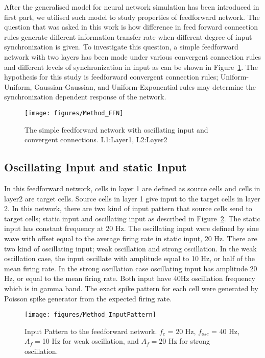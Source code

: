 After the generalised model for neural network simulation has been introduced in first part, we utilised such model to study properties of feedforward network. The question that was asked in this work is how difference in feed forward connection rules generate different information transfer rate when different degree of input synchronization is given. To investigate this question, a simple feedforward network with two layers has been made under various convergent connection rules and different levels of synchronization in input as can be shown in Figure~\ref{fig:FFmodel}. The hypothesis for this study is feedforward convergent connection rules; Uniform-Uniform, Gaussian-Gaussian, and Uniform-Exponential rules may determine the synchronization dependent response of the network.
\begin{figure}[!h]
	\centering
	\texttt{[image: figures/Method\_FFN]}
	\caption{The simple feedforward network with oscillating input and convergent connections. L1:Layer1, L2:Layer2}
	\label{fig:FFmodel}
\end{figure} 

\subsection{Oscillating Input and static Input}
 In this feedforward network, cells in layer 1 are defined as source cells and cells in layer2 are target cells. Source cells in layer 1 give input to the target cells in layer 2. In this network, there are two kind of input pattern that source cells send to target cells; static input and oscillating input as described in Figure~\ref{fig:InputFFN}.  The static input has constant frequency at 20 Hz. The oscillating input were defined by sine wave with offset equal to the average firing rate in static input, 20 Hz. There are two kind of oscillating input; weak oscillation and strong oscillation. In the weak oscillation case, the input oscillate with amplitude equal to 10 Hz, or half of the mean firing rate. In the strong oscillation case oscillating input has amplitude 20 Hz, or equal to the mean firing rate. Both input have 40Hz oscillation frequency which is in gamma band.  The exact spike pattern for each cell were generated by Poisson spike generator from the expected firing rate.

\begin{figure}[!h]
	\centering
	\texttt{[image: figures/Method\_InputPattern]}
	\caption{Input Pattern to the feedforward network. $f_c$ = 20 Hz, $f_{osc}$ = 40 Hz,$A_f = $10 Hz for weak oscillation, and $A_f = 20$ Hz for strong oscillation.}
	\label{fig:InputFFN}
\end{figure} 

